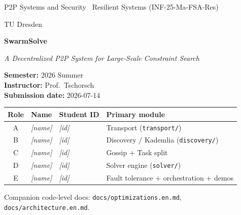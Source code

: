 \documentclass[11pt,a4paper]{article}
\newcommand{\code}[1]{\texttt{#1}}
\begin{document}
\begin{titlepage}
  \centering
  \vspace*{2cm}
  {\large P2P Systems and Security \textperiodcentered\ Resilient Systems (INF-25-Ma-FSA-Res)\par}
  {\large TU Dresden\par}
  \vspace{2.5cm}
  {\Huge\bfseries SwarmSolve\par}
  \vspace{0.5cm}
  {\large\itshape A Decentralized P2P System for Large-Scale Constraint Search\par}
  \vspace{2.5cm}
  {\large
   \textbf{Semester:} 2026 Summer\\[4pt]
   \textbf{Instructor:} Prof.\ Tschorsch\\[4pt]
   \textbf{Submission date:} 2026-07-14\par}
  \vspace{2cm}

  \renewcommand{\arraystretch}{1.3}
  \begin{tabular}{c l l l}
    \toprule
    \textbf{Role} & \textbf{Name} & \textbf{Student ID} & \textbf{Primary module}\\
    \midrule
    A & \textit{[name]} & \textit{[id]} & Transport (\code{transport/})\\
    B & \textit{[name]} & \textit{[id]} & Discovery / Kademlia (\code{discovery/})\\
    C & \textit{[name]} & \textit{[id]} & Gossip + Task split\\
    D & \textit{[name]} & \textit{[id]} & Solver engine (\code{solver/})\\
    E & \textit{[name]} & \textit{[id]} & Fault tolerance + orchestration + demos\\
    \bottomrule
  \end{tabular}

  \vfill
  {\small Companion code-level docs: \code{docs/optimizations.en.md}, \code{docs/architecture.en.md}.\par}
\end{titlepage}
\end{document}
